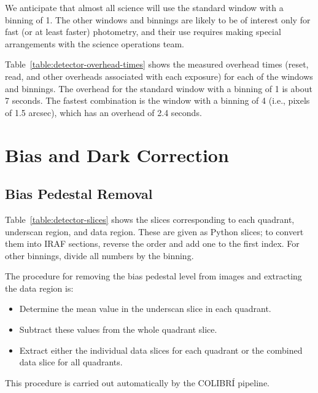 We anticipate that almost all science will use the standard  window with a binning of 1. The other windows and binnings are likely to be of interest only for fast (or at least faster) photometry, and their use requires making special arrangements with the science operations team.

Table~\ref{table:detector-overhead-times} shows the measured overhead times (reset, read, and other overheads associated with each exposure) for each of the windows and binnings. The overhead for the standard  window with a binning of 1 is about 7 seconds. The fastest combination is the  window with a binning of 4 (i.e., pixels of 1.5 arcsec), which has an overhead of 2.4 seconds.

\section{Bias and Dark Correction}

\subsection{Bias Pedestal Removal}

Table~\ref{table:detector-slices} shows the slices corresponding to each quadrant, underscan region, and data region. These are given as Python slices; to convert them into IRAF sections, reverse the order and add one to the first index. For other binnings, divide all numbers by the binning.

The procedure for removing the bias pedestal level from  images and extracting the data region is:
\begin{itemize}
\item Determine the mean value in the underscan slice in each quadrant.
\item Subtract these values from the whole quadrant slice.
\item Extract either the individual data slices for each quadrant or the combined data slice for all quadrants.
\end{itemize}

This procedure is carried out automatically by the COLIBRÍ pipeline.

